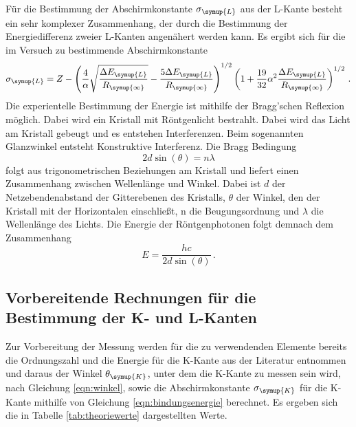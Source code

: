 Für die Bestimmung der Abschirmkonstante $\sigma_{\symup{L}}$ aus der L-Kante besteht ein
sehr komplexer Zusammenhang, der durch die Bestimmung der Energiedifferenz zweier
L-Kanten angenähert werden kann. Es ergibt sich für die im Versuch zu bestimmende
Abschirmkonstante
\begin{equation}
  \sigma_{\symup{L}}=Z-\left(\frac{4}{\alpha} \sqrt{\frac{\Delta E_{\symup{L}}}{R_{\symup{\infty}}}}
  -\frac{5\Delta E_{\symup{L}}}{R_{\symup{\infty}}}\right)^{1/2}
  \left(1+\frac{19}{32}\alpha^2 \frac{\Delta E_{\symup{L}}}{R_{\symup{\infty}}}\right)^{1/2} \,.
  \label{eqn:naeherung}
\end{equation}
Die experientelle Bestimmung der Energie ist mithilfe der Bragg'schen Reflexion
möglich. Dabei wird ein Kristall mit Röntgenlicht bestrahlt. Dabei wird das Licht
am Kristall gebeugt und es entstehen Interferenzen. Beim sogenannten Glanzwinkel
entsteht Konstruktive Interferenz. Die Bragg Bedingung
\begin{equation}
  2 d \sin(\theta)= n \lambda
  \label{eqn:bragg}
\end{equation}
folgt aus trigonometrischen Beziehungen am Kristall und liefert einen Zusammenhang
zwischen Wellenlänge und Winkel. Dabei ist $d$ der Netzebendenabstand der Gitterebenen
des Kristalls, $\theta$ der Winkel, den der Kristall mit der Horizontalen einschließt,
n die Beugungsordnung und $\lambda$ die Wellenlänge des Lichts.  Die Energie der
Röntgenphotonen folgt demnach dem Zusammenhang
\begin{equation}
  E=\frac{h c}{2 d \sin(\theta)} \,.
  \label{eqn:winkel}
\end{equation}


\subsection{Vorbereitende Rechnungen für die Bestimmung der K- und L-Kanten}
\label{sec:K_L_Kanten}

Zur Vorbereitung der Messung werden für die zu verwendenden Elemente bereits
die Ordnungszahl und die Energie für die K-Kante aus der Literatur entnommen und
daraus der Winkel $\theta_{\symup{K}}$, unter dem die K-Kante zu messen sein wird,
nach Gleichung \eqref{eqn:winkel}, sowie die Abschirmkonstante $\sigma_{\symup{K}}$
für die K-Kante mithilfe von Gleichung \eqref{eqn:bindungsenergie} berechnet.
Es ergeben sich die in Tabelle \ref{tab:theoriewerte} dargestellten Werte.

